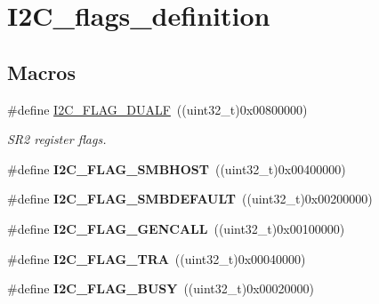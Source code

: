 \hypertarget{group___i2_c__flags__definition}{\section{I2\-C\-\_\-flags\-\_\-definition}
\label{group___i2_c__flags__definition}
}
\subsection*{Macros}
\begin{DoxyCompactItemize}
\item 
\hypertarget{group___i2_c__flags__definition_ga3755b783aa73568659478c2e2e45e27f}{\#define \hyperlink{group___i2_c__flags__definition_ga3755b783aa73568659478c2e2e45e27f}{I2\-C\-\_\-\-F\-L\-A\-G\-\_\-\-D\-U\-A\-L\-F}~((uint32\-\_\-t)0x00800000)}\label{group___i2_c__flags__definition_ga3755b783aa73568659478c2e2e45e27f}

\begin{DoxyCompactList}\small\item\em S\-R2 register flags. \end{DoxyCompactList}\item 
\hypertarget{group___i2_c__flags__definition_gaf15403a1852f39aaadbb8942ba98d97e}{\#define {\bfseries I2\-C\-\_\-\-F\-L\-A\-G\-\_\-\-S\-M\-B\-H\-O\-S\-T}~((uint32\-\_\-t)0x00400000)}\label{group___i2_c__flags__definition_gaf15403a1852f39aaadbb8942ba98d97e}

\item 
\hypertarget{group___i2_c__flags__definition_ga371fb29861d1cd41736253e804c67ad5}{\#define {\bfseries I2\-C\-\_\-\-F\-L\-A\-G\-\_\-\-S\-M\-B\-D\-E\-F\-A\-U\-L\-T}~((uint32\-\_\-t)0x00200000)}\label{group___i2_c__flags__definition_ga371fb29861d1cd41736253e804c67ad5}

\item 
\hypertarget{group___i2_c__flags__definition_gab3a93b6840ad406c2fc09e0e96c59b88}{\#define {\bfseries I2\-C\-\_\-\-F\-L\-A\-G\-\_\-\-G\-E\-N\-C\-A\-L\-L}~((uint32\-\_\-t)0x00100000)}\label{group___i2_c__flags__definition_gab3a93b6840ad406c2fc09e0e96c59b88}

\item 
\hypertarget{group___i2_c__flags__definition_ga0359a5f960670d51cb17e659d32498ea}{\#define {\bfseries I2\-C\-\_\-\-F\-L\-A\-G\-\_\-\-T\-R\-A}~((uint32\-\_\-t)0x00040000)}\label{group___i2_c__flags__definition_ga0359a5f960670d51cb17e659d32498ea}

\item 
\hypertarget{group___i2_c__flags__definition_ga50f69f043d99600221076100823b6ff3}{\#define {\bfseries I2\-C\-\_\-\-F\-L\-A\-G\-\_\-\-B\-U\-S\-Y}~((uint32\-\_\-t)0x00020000)}\label{group___i2_c__flags__definition_ga50f69f043d99600221076100823b6ff3}


\end{DoxyCompactItemize}
